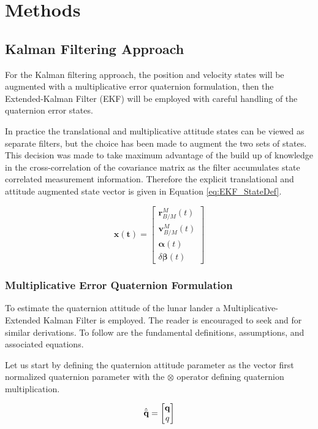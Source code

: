 \documentclass[conf]{new-aiaa}
\newcommand{\vect}[1]{\mathbf{#1}}
\newcommand{\rBM}{\vect{r}^M_{B/M}}      %
\newcommand{\vBM}{\vect{v}^M_{B/M}}      %
\newcommand{\qUnitGeneric}{\hat{\Bar{\mathbf{q}}}}
\begin{document}
\section{Methods}
\subsection{Kalman Filtering Approach}
\label{sec:EKFMEKFMeth}

For the Kalman filtering approach, the position and velocity states will be augmented with a multiplicative error quaternion formulation, then the Extended-Kalman Filter (EKF) will be employed with careful handling of the quaternion error states. 

In practice the translational and multiplicative attitude states can be viewed as separate filters, but the choice has been made to augment the two sets of states. This decision was made to take maximum advantage of the build up of knowledge in the cross-correlation of the covariance matrix as the filter accumulates state correlated measurement information. Therefore the explicit translational and attitude augmented state vector is given in Equation \ref{eq:EKF_StateDef}.

\begin{equation}
\vect{x(t)} =
\begin{bmatrix}
\rBM(t) \\[4pt]
\vBM(t) \\[4pt]
\vect{\alpha}(t) \\
\delta\vect{\beta}(t)
\end{bmatrix}
\label{eq:EKF_StateDef}
\end{equation}



\subsubsection{Multiplicative Error Quaternion Formulation}
To estimate the quaternion attitude of the lunar lander a Multiplicative-Extended Kalman Filter is employed. The reader is encouraged to seek \cite{crassidis2011optimal} and  \cite{markley2004multiplicative} for similar derivations. To follow are the fundamental definitions, assumptions, and associated equations.


Let us start by defining the quaternion attitude parameter as the vector first normalized quaternion parameter with the $\otimes$ operator defining quaternion multiplication.

\begin{equation}
    \qUnitGeneric =
    \begin{bmatrix}
        \vect{q} \\
        q
    \end{bmatrix}
    \label{eqDef:QuatVecFirstDef}
\end{equation}
\end{document}
